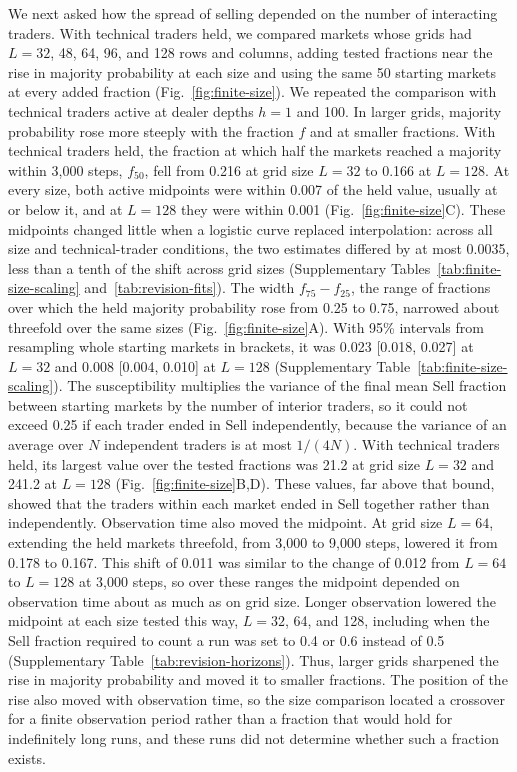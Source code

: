 We next asked how the spread of selling depended on the number of
interacting traders. With technical traders held, we compared markets
whose grids had $L=32$, 48, 64, 96, and 128 rows and columns, adding
tested fractions near the rise in majority probability at each size and
using the same 50 starting markets at every added fraction
(Fig.~\ref{fig:finite-size}). We repeated the comparison with technical
traders active at dealer depths $h=1$ and 100. In larger grids, majority
probability rose more steeply with the fraction $f$ and at smaller
fractions. With technical traders held, the fraction at which half the
markets reached a majority within 3,000 steps, $f_{50}$, fell from 0.216
at grid size $L=32$ to 0.166 at $L=128$. At every size, both active
midpoints were within 0.007 of the held value, usually at or below it,
and at $L=128$ they were within 0.001
(Fig.~\ref{fig:finite-size}C). These midpoints changed little when a
logistic curve replaced interpolation: across all size and
technical-trader conditions, the two estimates differed by at most
0.0035, less than a tenth of the shift across grid sizes
(Supplementary Tables~\ref{tab:finite-size-scaling} and~\ref{tab:revision-fits}).
The width $f_{75}-f_{25}$, the range of fractions over which the held
majority probability rose from 0.25 to 0.75, narrowed about threefold
over the same sizes (Fig.~\ref{fig:finite-size}A). With 95\% intervals
from resampling whole starting markets in brackets, it was
0.023 [0.018, 0.027] at $L=32$ and 0.008 [0.004, 0.010] at $L=128$
(Supplementary Table~\ref{tab:finite-size-scaling}).
The susceptibility multiplies the variance of the final mean Sell
fraction between starting markets by the number of interior traders, so it could not exceed 0.25 if each trader ended in Sell independently,
because the variance of an average over $N$ independent traders is at
most $1/(4N)$.
With technical traders held, its largest value over the tested fractions
was 21.2 at grid size $L=32$ and 241.2 at $L=128$
(Fig.~\ref{fig:finite-size}B,D). These values, far above that bound,
showed that the traders within each market ended in Sell together rather
than independently. Observation
time also moved the midpoint. At grid size $L=64$, extending the held
markets threefold, from 3,000 to 9,000 steps, lowered it from 0.178 to
0.167. This shift of 0.011 was similar to the change of 0.012 from $L=64$ to
$L=128$ at 3,000 steps, so over these ranges the midpoint depended on observation time
about as much as on grid size. Longer observation lowered the midpoint at each size tested this
way, $L=32$, 64, and 128, including when the Sell fraction required to
count a run was set to 0.4 or 0.6 instead of 0.5
(Supplementary Table~\ref{tab:revision-horizons}). Thus, larger grids
sharpened the rise in majority probability and moved it to smaller
fractions. The position of the rise also moved with observation time,
so the size
comparison located a crossover for a finite observation period rather than a fraction that would hold for indefinitely long runs, and
these runs did not determine whether such a fraction exists.

